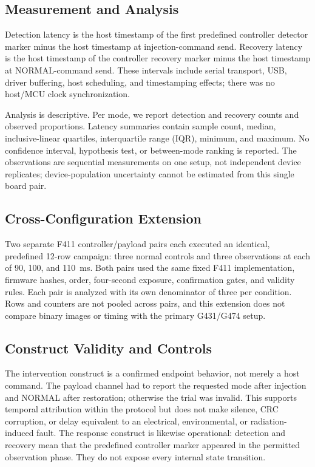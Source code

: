 \documentclass[conference]{IEEEtran}
\begin{document}
\subsection{Measurement and Analysis}

Detection latency is the host timestamp of the first predefined controller detector marker minus the host timestamp at injection-command send. Recovery latency is the host timestamp of the controller recovery marker minus the host timestamp at NORMAL-command send. These intervals include serial transport, USB, driver buffering, host scheduling, and timestamping effects; there was no host/MCU clock synchronization.

Analysis is descriptive. Per mode, we report detection and recovery counts and observed proportions. Latency summaries contain sample count, median, inclusive-linear quartiles, interquartile range (IQR), minimum, and maximum. No confidence interval, hypothesis test, or between-mode ranking is reported. The observations are sequential measurements on one setup, not independent device replicates; device-population uncertainty cannot be estimated from this single board pair.

\subsection{Cross-Configuration Extension}

Two separate F411 controller/payload pairs each executed an identical, predefined 12-row campaign: three normal controls and three observations at each of 90, 100, and 110~ms. Both pairs used the same fixed F411 implementation, firmware hashes, order, four-second exposure, confirmation gates, and validity rules. Each pair is analyzed with its own denominator of three per condition. Rows and counters are not pooled across pairs, and this extension does not compare binary images or timing with the primary G431/G474 setup.

\subsection{Construct Validity and Controls}

The intervention construct is a confirmed endpoint behavior, not merely a host command. The payload channel had to report the requested mode after injection and NORMAL after restoration; otherwise the trial was invalid. This supports temporal attribution within the protocol but does not make silence, CRC corruption, or delay equivalent to an electrical, environmental, or radiation-induced fault. The response construct is likewise operational: detection and recovery mean that the predefined controller marker appeared in the permitted observation phase. They do not expose every internal state transition.
\end{document}
